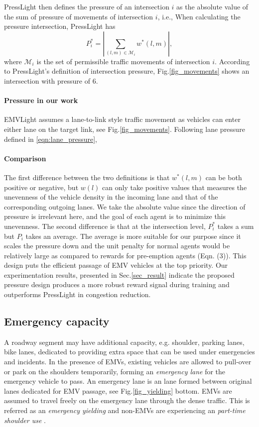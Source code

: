 PressLight then defines the pressure of an intersection $i$ as the absolute value of the sum of pressure of movements of intersection $i$, i.e., 
When calculating the pressure intersection, PressLight has
\begin{equation*}\label{eq:PressLight_pressure}
    P^{*}_{i} = \left|\sum _{(l, m)\in \mathcal{M}_i} w^{*}(l, m)\right|,
\end{equation*}
where $\mathcal{M}_i$ is the set of permissible traffic movements of intersection $i$. According to PressLight's definition of intersection pressure, Fig.\ref{fig_movements} shows an intersection with pressure of 6.

\paragraph{Pressure in our work}
EMVLight assumes a lane-to-link style traffic movement as vehicles can enter either lane on the target link, see Fig.\ref{fig_movements}. 
Following lane pressure defined in \eqref{eqn:lane_pressure}, 


\paragraph{Comparison}
The first difference between the two definitions is that $w^{*}(l, m)$ can be both positive or negative, but $w(l)$ can only take positive values that measures the unevenness of the vehicle density in the incoming lane and that of the corresponding outgoing lanes. We take the absolute value since the direction of pressure is irrelevant here, and the goal of each agent is to minimize this unevenness. The second difference is that at the intersection level, $P^{*}_{i}$ takes a sum but $P_{i}$ takes an average. The average is more suitable for our purpose since it scales the pressure down and the unit penalty for normal agents would be relatively large as compared to rewards for pre-emption agents (Eqn. (3)).  This design puts the efficient passage of EMV vehicles at the top priority. Our experimentation results, presented in Sec.\ref{sec_result} indicate the proposed pressure design produces a more robust reward signal during training and outperforms PressLight in congestion reduction.

\subsection{Emergency capacity}

A roadway segment may have additional capacity, e.g. shoulder, parking lanes, bike lanes, dedicated to providing extra space that can be used under emergencies and incidents.
In the presence of EMVs, existing vehicles are allowed to pull-over or park on the shoulders temporarily, forming an \emph{emergency lane} for the emergency vehicle to pass. An emergency lane is an lane formed between original lanes dedicated for EMV passage, see Fig.\ref{fig_yielding} bottom. EMVs are assumed to travel freely on the emergency lane through the dense traffic. This is referred as an \emph{emergency yielding} and non-EMVs are experiencing an \emph{part-time shoulder use} \cite{part-time-shoulder-use}.

